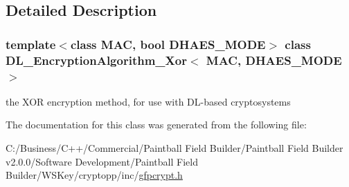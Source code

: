 \subsection{Detailed Description}
\subsubsection*{template$<$class MAC, bool DHAES\_\-MODE$>$ class DL\_\-EncryptionAlgorithm\_\-Xor$<$ MAC, DHAES\_\-MODE $>$}

the XOR encryption method, for use with DL-\/based cryptosystems 

The documentation for this class was generated from the following file:\begin{DoxyCompactItemize}
\item 
C:/Business/C++/Commercial/Paintball Field Builder/Paintball Field Builder v2.0.0/Software Development/Paintball Field Builder/WSKey/cryptopp/inc/\hyperlink{gfpcrypt_8h}{gfpcrypt.h}\end{DoxyCompactItemize}
